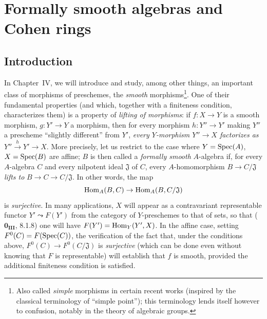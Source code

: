\section{Formally smooth algebras and Cohen rings}
\label{section:0.19}

\setcounter{subsection}{-1}
\subsection{Introduction}
\label{subsection:0.19.0}
\label{0.19.0}

\begin{env}[19.0.1]
\label{0.19.0.1}
In Chapter~IV, we will introduce and study, among other things, an important class of morphisms of preschemes, the \emph{smooth} morphisms\footnote{Also called \emph{simple} morphisms in certain recent works (inspired by the classical terminology of ``simple point''); this terminology lends itself however to confusion, notably in the theory of algebraic groups.}.
One of their fundamental properties (and which, together with a finiteness condition, characterizes them) is a property of \emph{lifting of morphisms}:
if $f:X\to Y$ is a smooth morphism, $g:Y'\to Y$ a morphism, then for every morphism $h:Y''\to Y'$ making $Y''$ a prescheme ``slightly different'' from $Y'$, \emph{every $Y$-morphism $Y''\to X$ factorizes as} $Y''\xrightarrow{h}Y'\to X$.
More precisely, let us restrict to the case where $Y=\operatorname{Spec}(A)$, $X=\operatorname{Spec}(B)$ are affine;
$B$ is then called a \emph{formally smooth} $A$-algebra if, for every $A$-algebra $C$ and every nilpotent ideal $\mathfrak{J}$ of $C$, every $A$-homomorphism $B\to C/\mathfrak{J}$ \emph{lifts to} $B\to C\to C/\mathfrak{J}$.
In other words, the map
\[
  \operatorname{Hom}_A(B,C) \to \operatorname{Hom}_A(B,C/\mathfrak{J})
\]
is \emph{surjective}.
In many applications, $X$ will appear as a contravariant representable functor $Y'\leadsto F(Y')$ from the category of $Y$-preschemes to that of sets, so that ($\mathbf{0_{III}}$, 8.1.8) one will have $F(Y')=\operatorname{Hom}_Y(Y',X)$.
In the affine case, setting $F^0(C)=F(\operatorname{Spec}(C))$, the verification of the fact that, under the conditions above, $F^0(C)\to F^0(C/\mathfrak{J})$ is \emph{surjective} (which can be done even without knowing that $F$ is representable) will establish that $f$ is smooth, provided the additional finiteness condition is satisfied.
\end{env}

